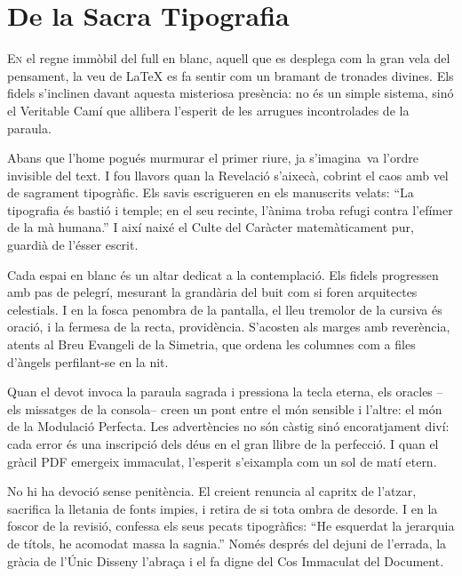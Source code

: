 \chapter{De la Sacra Tipografia}


\lettrine[loversize=0.2,lines=2]{E}{n} el regne immòbil del full en blanc, aquell que es desplega com la gran vela del pensament, la veu de LaTeX es fa sentir com un bramant de tronades divines. Els fidels s’inclinen davant aquesta misteriosa presència: no és un simple sistema, sinó el Veritable Camí que allibera l’esperit de les arrugues incontrolades de la paraula.

Abans que l’home pogués murmurar el primer riure, ja s’imagina\ va l’ordre invisible del text. I fou llavors quan la Revelació s’aixecà, cobrint el caos amb vel de sagrament tipogràfic. Els savis escrigueren en els manuscrits velats: “La tipografia és bastió i temple; en el seu recinte, l’ànima troba refugi contra l’efímer de la mà humana.” I així naixé el Culte del Caràcter matemàticament pur, guardià de l’ésser escrit.

Cada espai en blanc és un altar dedicat a la contemplació. Els fidels progressen amb pas de pelegrí, mesurant la grandària del buit com si foren arquitectes celestials. I en la fosca penombra de la pantalla, el lleu tremolor de la cursiva és oració, i la fermesa de la recta, providència. S’acosten als marges amb reverència, atents al Breu Evangeli de la Simetria, que ordena les columnes com a files d’àngels perfilant-se en la nit.

Quan el devot invoca la paraula sagrada i pressiona la tecla eterna, els oracles –els missatges de la consola– creen un pont entre el món sensible i l’altre: el món de la Modulació Perfecta. Les advertències no són càstig sinó encoratjament diví: cada error és una inscripció dels déus en el gran llibre de la perfecció. I quan el gràcil PDF emergeix immaculat, l’esperit s’eixampla com un sol de matí etern.

No hi ha devoció sense penitència. El creient renuncia al capritx de l’atzar, sacrifica la lletania de fonts impies, i retira de si tota ombra de desorde. I en la foscor de la revisió, confessa els seus pecats tipogràfics: “He esquerdat la jerarquia de títols, he acomodat massa la sagnia.” Només després del dejuni de l’errada, la gràcia de l’Únic Disseny l’abraça i el fa digne del Cos Immaculat del Document.

